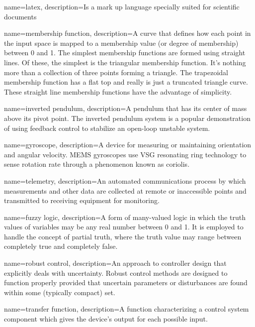 \makenoidxglossaries 

{
    name=latex,
    description={Is a mark up language specially suited 
    for scientific documents}
}









{
    name=membership function,
    description={A curve that defines how each point in the input space is mapped to a membership value (or degree of membership) between 0 and 1. The simplest membership functions are formed using straight lines. Of these, the simplest is the triangular membership function. It's nothing more than a collection of three points forming a triangle. The trapezoidal membership function has a flat top and really is just a truncated triangle curve. These straight line membership functions have the advantage of simplicity.}
}

{
    name=inverted pendulum,
    description={A pendulum that has its center of mass above its pivot point. The inverted pendulum system is a popular demonstration of using feedback control to stabilize an open-loop unstable system. }
}

{
    name=gyroscope,
    description={A device for measuring or maintaining orientation and angular velocity. MEMS gyroscopes use VSG resonating ring technology to sense rotation rate through a phenomenon known as coriolis. }
}

 
 
{
    name=telemetry,
    description={An automated communications process by which measurements and other data are collected at remote or inaccessible points and transmitted to receiving equipment for monitoring.}
}

{
    name=fuzzy logic,
    description={A form of many-valued logic in which the truth values of variables may be any real number between 0 and 1. It is employed to handle the concept of partial truth, where the truth value may range between completely true and completely false.}
}

{
	name=robust control,
	description={An approach to controller design that explicitly deals with uncertainty. Robust control methods are designed to function properly provided that uncertain parameters or disturbances are found within some (typically compact) set.}
}

{
	name=transfer function,
	description={A function characterizing a control system component which gives the device's output for each possible input.}
}
